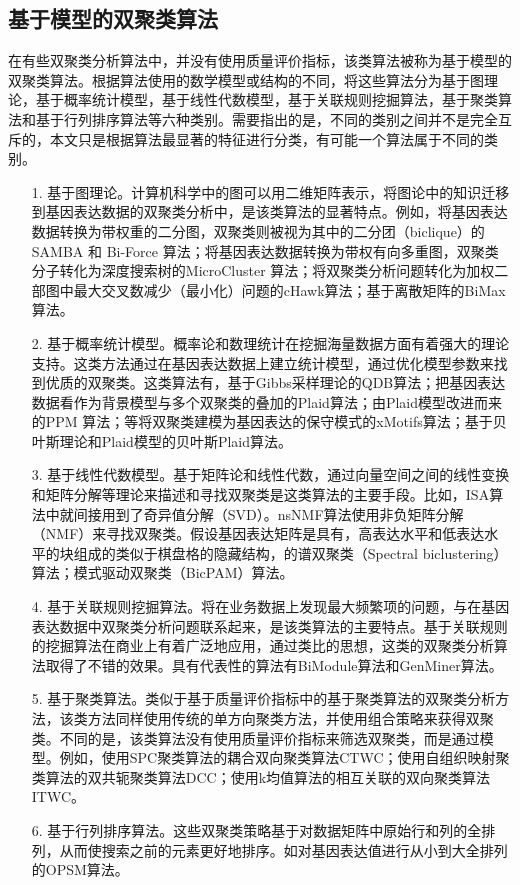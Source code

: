   \subsection{基于模型的双聚类算法}
  在有些双聚类分析算法中，并没有使用质量评价指标，该类算法被称为基于模型的双聚类算法。根据算法使用的数学模型或结构的不同，将这些算法分为基于图理论，基于概率统计模型，基于线性代数模型，基于关联规则挖掘算法，基于聚类算法和基于行列排序算法等六种类别。需要指出的是，不同的类别之间并不是完全互斥的，本文只是根据算法最显著的特征进行分类，有可能一个算法属于不同的类别。

  \begin{enumerate}
    \item[1.]基于图理论。计算机科学中的图可以用二维矩阵表示，将图论中的知识迁移到基因表达数据的双聚类分析中，是该类算法的显著特点。例如，将基因表达数据转换为带权重的二分图，双聚类则被视为其中的二分团（biclique）的SAMBA 和 Bi-Force 算法\cite{bi-force}；将基因表达数据转换为带权有向多重图，双聚类分子转化为深度搜索树的MicroCluster 算法\cite{microcluster}；将双聚类分析问题转化为加权二部图中最大交叉数减少（最小化）问题的cHawk算法；基于离散矩阵的BiMax算法。

    \item[2.]基于概率统计模型。概率论和数理统计在挖掘海量数据方面有着强大的理论支持。这类方法通过在基因表达数据上建立统计模型，通过优化模型参数来找到优质的双聚类。这类算法有，基于Gibbs采样理论的QDB算法\cite{qdb}；把基因表达数据看作为背景模型与多个双聚类的叠加的Plaid算法；由Plaid模型改进而来的PPM 算法；等将双聚类建模为基因表达的保守模式的xMotifs算法；基于贝叶斯理论和Plaid模型的贝叶斯Plaid算法。
    
    \item[3.]基于线性代数模型。基于矩阵论和线性代数，通过向量空间之间的线性变换和矩阵分解等理论来描述和寻找双聚类是这类算法的主要手段。比如，ISA算法中就间接用到了奇异值分解（SVD）。nsNMF算法使用非负矩阵分解（NMF）来寻找双聚类。假设基因表达矩阵是具有，高表达水平和低表达水平的块组成的类似于棋盘格的隐藏结构，的谱双聚类（Spectral biclustering）算法；模式驱动双聚类（BicPAM）算法。
    
    \item[4.]基于关联规则挖掘算法。将在业务数据上发现最大频繁项的问题，与在基因表达数据中双聚类分析问题联系起来，是该类算法的主要特点。基于关联规则的挖掘算法在商业上有着广泛地应用，通过类比的思想，这类的双聚类分析算法取得了不错的效果。具有代表性的算法有BiModule算法和GenMiner算法。

    \item[5.]基于聚类算法。类似于基于质量评价指标中的基于聚类算法的双聚类分析方法，该类方法同样使用传统的单方向聚类方法，并使用组合策略来获得双聚类。不同的是，该类算法没有使用质量评价指标来筛选双聚类，而是通过模型。例如，使用SPC聚类算法的耦合双向聚类算法CTWC；使用自组织映射聚类算法的双共轭聚类算法DCC；使用k均值算法的相互关联的双向聚类算法ITWC。
    
    \item[6.]基于行列排序算法。这些双聚类策略基于对数据矩阵中原始行和列的全排列，从而使搜索之前的元素更好地排序。如对基因表达值进行从小到大全排列的OPSM算法。
  \end{enumerate}

